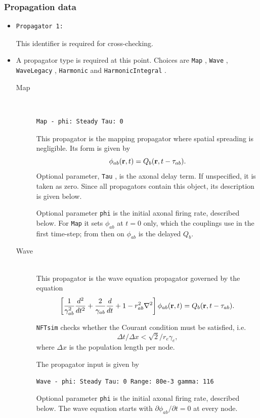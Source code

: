 \documentclass[12pt,a4paper]{article}
\newcommand{\type}[1]{{\small\small\tt #1} }
\newcommand{\NF}[0]{\type{NFTsim}}
\begin{document}
\subsubsection{Propagation data}
\label{sec:prop}
\begin{itemize}
\item
    \begin{lstlisting}
Propagator 1:
    \end{lstlisting}
    This identifier is required for cross-checking.
\item A propagator type is required at this point. Choices are \type{Map}, \type{Wave}, \type{WaveLegacy}, \type{Harmonic} and \type{HarmonicIntegral}.
\begin{description}
    \item[Map]\ \\
    \begin{lstlisting}
Map - phi: Steady Tau: 0
    \end{lstlisting}
    This propagator is the mapping propagator where spatial spreading is negligible. Its form is given by
    \[\phi_{ab}({\bf r}, t) = Q_b ({\bf r}, t - \tau_{ab}).\]
    Optional parameter, \type{Tau}, is the axonal delay term. If unspecified, it is taken as zero. Since all propagators contain this object, its description is given below.

    Optional parameter \type{phi} is the initial axonal firing rate, described below.
    For \type{Map} it sets \(\phi_{ab}\) at \(t=0\) only, which the couplings use in the first time-step; from then on \(\phi_{ab}\) is the delayed \(Q_b\).

    \item[Wave]\ \\
    This propagator is the wave equation propagator governed by the equation
    \[\left[\frac{1}{\gamma_{ab}^2}\frac{d^2}{d t^2}+\frac{2}{\gamma_{ab}}\frac{d} {d t}+1 -r^2_{ab}\nabla^2 \right] \phi_{ab}({\bf r},t) =Q_b({\bf r},t-\tau_{ab}).\]

    \NF checks whether the Courant condition must be satisfied, i.e. \[\Delta t/\Delta x<\sqrt{2}/r_e\gamma_e,\] where $\Delta x$ is the population length per node.

    The propagator input is given by
    \begin{lstlisting}
Wave - phi: Steady Tau: 0 Range: 80e-3 gamma: 116
    \end{lstlisting}

    Optional parameter \type{phi} is the initial axonal firing rate, described below.
    The wave equation starts with \(\partial\phi_{ab}/\partial t = 0\) at every node.


\end{description}
\end{itemize}
\end{document}
